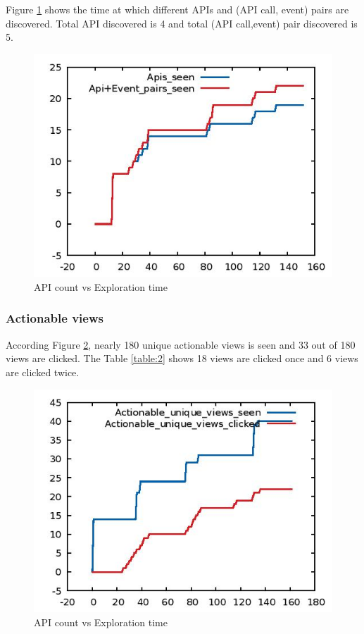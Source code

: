 Figure \ref{fig:cal_api} shows the time at which different APIs and (API call, event) pairs are discovered. Total API discovered is 4 and total (API call,event) pair discovered is 5.
\begin{figure}[!h]
  \centering
  \includegraphics [scale=1.4] {cal_api.jpg}
  \caption{API count vs Exploration time}
  \label{fig:cal_api}
\end{figure}

\subsubsection{Actionable views}
According Figure \ref{fig:cal_view}, nearly 180 unique actionable views is seen and 33 out of 180 views are clicked. The Table \ref{table:2} shows 18 views are clicked once and 6 views are clicked twice. 
\begin{figure}[!h]
  \centering
  \includegraphics [scale=1.4] {cal_view.jpg}
  \caption{API count vs Exploration time}
  \label{fig:cal_view}
\end{figure}

